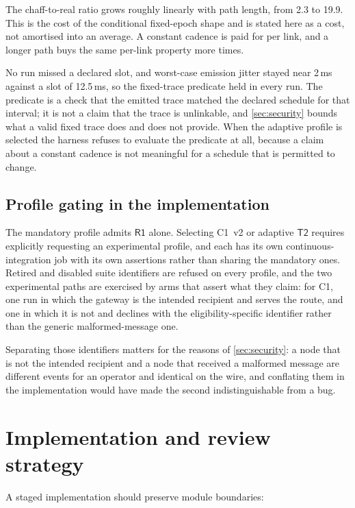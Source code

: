 \documentclass[11pt,oneside]{article}
\newcommand{\Rone}{\ensuremath{\mathsf{R1}}}
\newcommand{\Ttwo}{\ensuremath{\mathsf{T2}}}
\begin{document}
The chaff-to-real ratio grows roughly linearly with path length, from 2.3 to 19.9. This is the cost of the conditional fixed-epoch shape and is stated here as a cost, not amortised into an average. A constant cadence is paid for per link, and a longer path buys the same per-link property more times.

No run missed a declared slot, and worst-case emission jitter stayed near 2\,ms against a slot of 12.5\,ms, so the fixed-trace predicate held in every run. The predicate is a check that the emitted trace matched the declared schedule for that interval; it is not a claim that the trace is unlinkable, and \cref{sec:security} bounds what a valid fixed trace does and does not provide. When the adaptive profile is selected the harness refuses to evaluate the predicate at all, because a claim about a constant cadence is not meaningful for a schedule that is permitted to change.

\subsection{Profile gating in the implementation}

The mandatory profile admits \Rone{} alone. Selecting C1~v2 or adaptive \Ttwo{} requires explicitly requesting an experimental profile, and each has its own continuous-integration job with its own assertions rather than sharing the mandatory ones. Retired and disabled suite identifiers are refused on every profile, and the two experimental paths are exercised by arms that assert what they claim: for C1, one run in which the gateway is the intended recipient and serves the route, and one in which it is not and declines with the eligibility-specific identifier rather than the generic malformed-message one.

Separating those identifiers matters for the reasons of \cref{sec:security}: a node that is not the intended recipient and a node that received a malformed message are different events for an operator and identical on the wire, and conflating them in the implementation would have made the second indistinguishable from a bug.

\section{Implementation and review strategy}
\label{sec:implementation}

A staged implementation should preserve module boundaries:
\end{document}
